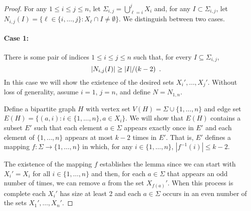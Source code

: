 \documentclass{patmorin}
\begin{document}
\begin{proof}
   For any $1\le i\le j\le n$, let $\Sigma_{i,j}=\bigcup_{\ell=i}^j
   X_i$ and, for any $I\subset\Sigma_{i,j}$, let
   $N_{i,j}(I)=\{\ell\in\{i,\ldots,j\}: X_\ell\cap I\neq\emptyset \}$.
   We distinguish between two cases.

   \paragraph{Case 1:}
   There is some pair of indices $1\le i\le j\le n$ such that, for every
   $I\subseteq\Sigma_{i,j}$, 
   \begin{equation}
       |N_{i,j}(I)| \ge |I|/(k-2) \enspace . \eqlabel{hall}
   \end{equation}
   In this case
   we will show the existence of the desired sets $X_{i}',\ldots,X_{j}'$.
   Without loss of generality, assume $i=1$, $j=n$, and define $N=N_{1,n}$.

   Define a bipartite graph $H$ with vertex
   set $V(H)=\Sigma\cup\{1,\ldots,n\}$ and edge set $E(H)=\{(a,i):
   i\in\{1,\ldots,n\}, a\in X_i\}$.  We will show that $E(H)$ contains a
   subset $E'$ such that each element $a\in\Sigma$ appears exactly once in
   $E'$ and each element of $\{1,\ldots,n\}$ appears at most $k-2$ times
   in $E'$.  That is, $E'$ defines a mapping $f:\Sigma\to\{1,\ldots,n\}$
   in which, for any $i\in\{1,\ldots,n\}$, $|f^{-1}(i)|\le k-2$.

   The existence of the mapping $f$ establishes the lemma since we can
   start with $X_i'=X_i$ for all $i\in\{1,\ldots,n\}$ and then, for each
   $a\in\Sigma$ that appears an odd number of times, we can remove $a$
   from the set $X_{f(a)}'$.  When this process is complete each $X_i'$
   has size at least 2 and each $a\in\Sigma$ occurs in an even number
   of the sets $X_1',\ldots,X_n'$.


\end{proof}
\end{document}
